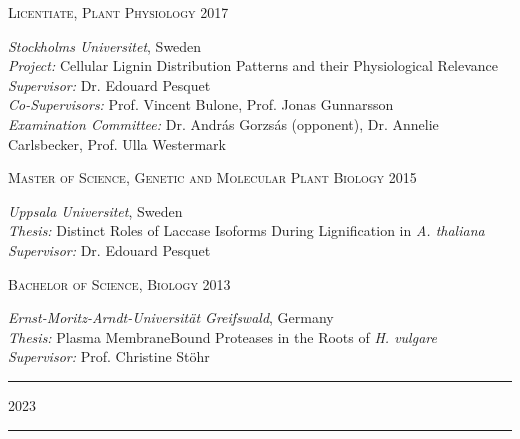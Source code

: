 \documentclass[11pt]{article}
\newcommand*{\xdash}[1][3em]{\rule[0.5ex]{#1}{0.55pt}}
\begin{document}
\begin{addmargin}[15pt]{0pt}
\textsc{\large{Licentiate, Plant Physiology} \hfill \textsc{2017}}
\end{addmargin}
\begin{addmargin}[24pt]{0pt}
	\textit{Stockholms Universitet}, Sweden \\
	\textit{Project:} Cellular Lignin Distribution Patterns and their Physiological Relevance \\
	\textit{Supervisor:} Dr. Edouard Pesquet \\
	\textit{Co-Supervisors:} Prof. Vincent Bulone, Prof. Jonas Gunnarsson\\
	\textit{Examination Committee:} Dr. András Gorzsás (opponent), Dr. Annelie Carlsbecker, Prof. Ulla Westermark
\end{addmargin}
\vspace{0.2cm}

\begin{addmargin}[15pt]{0pt}
\textsc{\large{Master of Science, Genetic and Molecular Plant Biology} \hfill \textsc{2015}}
\end{addmargin}
\begin{addmargin}[24pt]{0pt}
	\textit{Uppsala Universitet}, Sweden \\
	\textit{Thesis:} Distinct Roles of Laccase Isoforms During Lignification in \textit{ A. thaliana}\\
	\textit{Supervisor:} Dr. Edouard Pesquet
\end{addmargin}
\vspace{0.2cm}

\begin{addmargin}[15pt]{0pt}
\textsc{\large{Bachelor of Science, Biology} \hfill \textsc{2013}}
\end{addmargin}
\begin{addmargin}[24pt]{0pt}
	\textit{Ernst-Moritz-Arndt-Universität Greifswald}, Germany \\
	\textit{Thesis:} Plasma Membrane\textendash Bound Proteases in the Roots of \textit{H. vulgare}\\
	\textit{Supervisor:} Prof. Christine Stöhr
\end{addmargin}
\vspace{0.5cm}

\newpage


\hspace*{\fill} \xdash[6em] \large{\textsc{2023}} \xdash[6em] \hspace*{\fill} \normalsize
\end{document}
